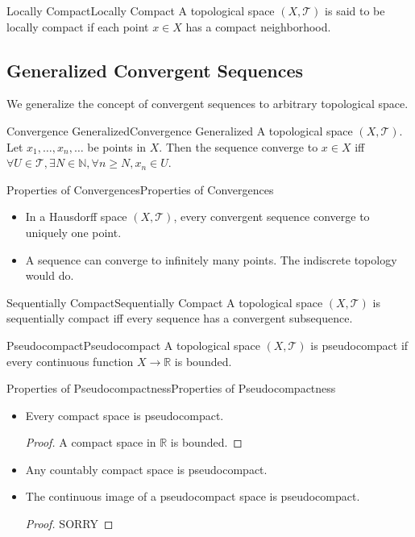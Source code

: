 \documentclass[../main.tex]{subfiles}
\begin{document}
\begin{definition}{Locally Compact}{Locally Compact}
A topological space $(X,\mathcal{T})$ is said to be locally compact if each point $x\in X$ has a compact neighborhood.
\end{definition}

\subsection{Generalized Convergent Sequences}

We generalize the concept of convergent sequences to arbitrary topological space.

\begin{definition}{Convergence Generalized}{Convergence Generalized}
	A topological space $(X,\mathcal{T})$. Let $x_1, \ldots ,x_n, \ldots $ be points in $X$. Then the sequence converge to $x\in X$ iff $\forall U\in \mathcal{T}, \exists N\in \mathbb{N}, \forall n \geq N, x_n\in U$.
\end{definition}

\begin{proposition}{Properties of Convergences}{Properties of Convergences}
\begin{itemize}
\item In a Hausdorff space $(X,\mathcal{T})$, every convergent sequence converge to uniquely one point.
\item A sequence can converge to infinitely many points. The indiscrete topology would do.
\end{itemize}
\end{proposition}

\begin{definition}{Sequentially Compact}{Sequentially Compact}
A topological space $(X,\mathcal{T})$ is sequentially compact iff every sequence has a convergent subsequence.
\end{definition}

\begin{definition}{Pseudocompact}{Pseudocompact}
A topological space $(X,\mathcal{T})$ is pseudocompact if every continuous function $X \rightarrow \mathbb{R}$ is bounded.
\end{definition}
\begin{proposition}{Properties of Pseudocompactness}{Properties of Pseudocompactness}
\begin{itemize}
\item Every compact space is pseudocompact.
	\begin{proof}
	A compact space in $\mathbb{R}$ is bounded.
	\end{proof}
\item Any countably compact space is pseudocompact.
\item The continuous image of a pseudocompact space is pseudocompact.
	\begin{proof}
	SORRY
	\end{proof}
\end{itemize}
\end{proposition}
\end{document}
